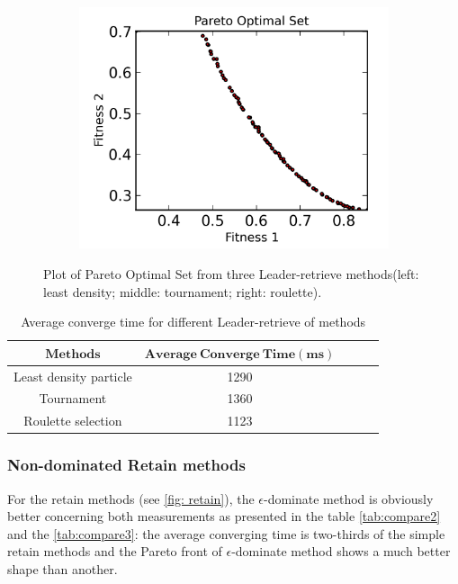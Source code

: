 \documentclass[12pt, runningheads,a4paper]{llncs}
\begin{document}
\begin{figure}
\begin{subfigure}[b]{0.3\textwidth}
        \end{subfigure}
        \begin{subfigure}[b]{0.3\textwidth}
                \centering
                \includegraphics[width=\textwidth]{./figs/rolette.png}
        \end{subfigure}
        \caption{Plot of Pareto Optimal Set from three Leader-retrieve methods(left: least density; middle: tournament; right: roulette).}\label{fig:retrieve}
\end{figure}

\begin{table}
  \caption {Average converge time for different Leader-retrieve of methods}  
  \label{tab:compare1}
    \begin{center}
\begin{tabular}{c|cccc} 
\toprule 
	$\mathbf{Methods}$   & $\mathbf{Average\ Converge\ Time (ms)}$\\
	\hline Least density particle &  1290 \\ 
         Tournament & 1360 \\
         Roulette selection & 1123\\
\bottomrule 
\end{tabular} 
\end{center}
\end{table}

\subsubsection{Non-dominated Retain methods}
For the retain methods (see \ref{fig: retain}),  the $\epsilon$-dominate method is obviously better concerning both measurements as presented in the table \ref{tab:compare2}  and the \ref{tab:compare3}: the average converging time is two-thirds of the simple retain methods and the Pareto front of $\epsilon$-dominate method shows a much better shape than another.
\end{document}
